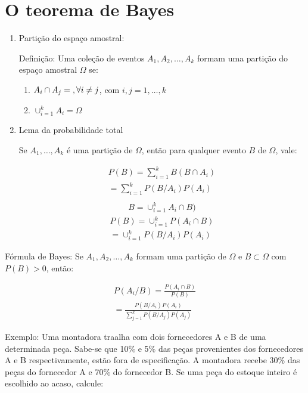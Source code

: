 \documentclass[11pt,a4paper]{article}
\begin{document}
\section{O teorema de Bayes}
\begin{enumerate}[label=(\alph*)]
  \item Partição do espaço amostral: 

    Definição: Uma coleção de eventos $A_1, A_2, \ldots, A_k$ formam uma partição 
    do espaço amostral $\Omega$ se:

    \begin{enumerate}
      \item $A_i \cap A_j = \null, \forall i\neq j$, com $i,j =1,\ldots,k$
      \item $\cup_{i=1}^{k}A_i= \Omega$
    \end{enumerate}
  \item Lema da probabilidade total 

    Se $A_1,\ldots, A_k$ é uma partição de $\Omega$, então para qualquer evento 
    $B$ de $\Omega$, vale:

    \begin{align}
      P(B)= \sum^k_{i=1} B(B \cap A_i)\\
      = \sum^k_{i=1} P(B/A_i)P(A_i)\\
    \end{align}
    \begin{align}
      B= \cup_{i=1}^k A_i \cap B)
    \end{align}
    \begin{align}
      P(B)= \cup_{i=1}^k P(A_i \cap B)\\
      = \cup_{i=1}^k P(B/A_i)P(A_i)
    \end{align}
\end{enumerate}

Fórmula de Bayes: Se $A_1,A_2,\ldots, A_k$ formam uma partição de $\Omega$ e 
$B \subset \Omega$ com $P(B)>0$, então:

\begin{align}
  P(A_i/ B)= \frac{P(A_i \cap B)}{P(B)}\\
  =\frac{P(B/A_i)P(A_i)}{\sum_{j=1}^k P(B/A_j)P(A_j)}
\end{align}

Exemplo: Uma montadora traalha com dois fornecedores A e B de uma determinada peça.
Sabe-se que 10\% e 5\% das peças provenientes dos fornecedores A e B respectivamente,
estão fora de especificação. A montadora recebe 30\% das peças do fornecedor A e 70\%
do fornecedor B. Se uma peça do estoque inteiro é escolhido ao acaso, calcule:
\end{document}
